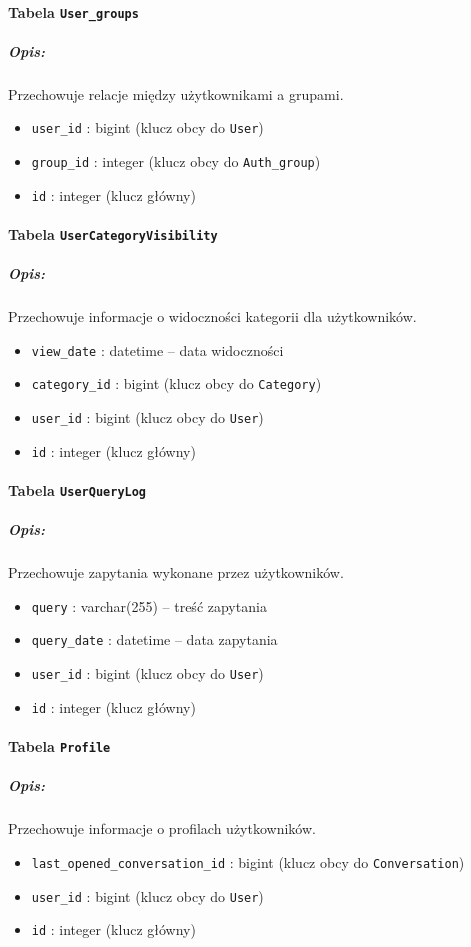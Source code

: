 \documentclass[12pt,a4paper,oneside]{article}
\theoremstyle{definition}
\numberwithin{equation}{section}
\begin{document}
\paragraph{Tabela \texttt{User\string_groups}}
\subparagraph{Opis:} Przechowuje relacje między użytkownikami a grupami.
\begin{itemize}
    \item \texttt{user\string_id} : bigint (klucz obcy do \texttt{User})
    \item \texttt{group\string_id} : integer (klucz obcy do \texttt{Auth\string_group})
    \item \texttt{id} : integer (klucz główny)
\end{itemize}

\paragraph{Tabela \texttt{UserCategoryVisibility}}
\subparagraph{Opis:} Przechowuje informacje o widoczności kategorii dla użytkowników.
\begin{itemize}
    \item \texttt{view\string_date} : datetime – data widoczności
    \item \texttt{category\string_id} : bigint (klucz obcy do \texttt{Category})
    \item \texttt{user\string_id} : bigint (klucz obcy do \texttt{User})
    \item \texttt{id} : integer (klucz główny)
\end{itemize}

\paragraph{Tabela \texttt{UserQueryLog}}
\subparagraph{Opis:} Przechowuje zapytania wykonane przez użytkowników.
\begin{itemize}
    \item \texttt{query} : varchar(255) – treść zapytania
    \item \texttt{query\string_date} : datetime – data zapytania
    \item \texttt{user\string_id} : bigint (klucz obcy do \texttt{User})
    \item \texttt{id} : integer (klucz główny)
\end{itemize}

\paragraph{Tabela \texttt{Profile}}
\subparagraph{Opis:} Przechowuje informacje o profilach użytkowników.
\begin{itemize}
    \item \texttt{last\string_opened\string_conversation\string_id} : bigint (klucz obcy do \texttt{Conversation})
    \item \texttt{user\string_id} : bigint (klucz obcy do \texttt{User})
    \item \texttt{id} : integer (klucz główny)
\end{itemize}
\end{document}
